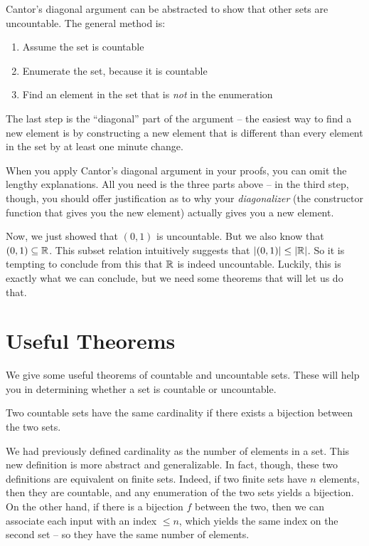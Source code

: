 \documentclass[main.tex]{subfiles}
\begin{document}
\begin{rem}
	Cantor's diagonal argument can be abstracted to show that other sets are uncountable. The general method is:
	\begin{enumerate}
		\item Assume the set is countable
		\item Enumerate the set, because it is countable
		\item Find an element in the set that is \textit{not} in the enumeration
	\end{enumerate}
	The last step is the ``diagonal'' part of the argument -- the easiest way to find a new element is by constructing a new element that is different than every element in the set by at least one minute change.
\end{rem}

\begin{rem}
	When you apply Cantor's diagonal argument in your proofs, you can omit the lengthy explanations. All you need is the three parts above -- in the third step, though, you should offer justification as to why your \textit{diagonalizer} (the constructor function that gives you the new element) actually gives you a new element.
\end{rem}

Now, we just showed that \((0,1)\) is uncountable. But we also know that \((0,1) \subseteq \mathbb{R}\). This subset relation intuitively suggests that \(|(0,1)| \leq |\mathbb{R}|\). So it is tempting to conclude from this that \(\mathbb{R}\) is indeed uncountable. Luckily, this is exactly what we can conclude, but we need some theorems that will let us do that.

\section{Useful Theorems}

We give some useful theorems of countable and uncountable sets. These will help you in determining whether a set is countable or uncountable.

\begin{defn}[Cardinality]
	Two countable sets have the same cardinality if there exists a bijection between the two sets.
\end{defn}

\begin{rem}
	We had previously defined cardinality as the number of elements in a set. This new definition is more abstract and generalizable. In fact, though, these two definitions are equivalent on finite sets. Indeed, if two finite sets have \(n\) elements, then they are countable, and any enumeration of the two sets yields a bijection. On the other hand, if there is a bijection \(f\) between the two, then we can associate each input with an index \(\leq n\), which yields the same index on the second set -- so they have the same number of elements.
\end{rem}
\end{document}
